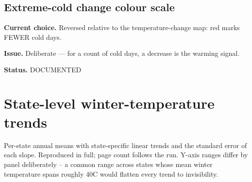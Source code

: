 \documentclass[11pt, english, letterpaper]{article}
\newcommand*{\figTwo}{exhibits}%
\begin{document}
\subsection*{Extreme-cold change colour scale}
\textbf{Current choice.} Reversed relative to the temperature-change map: red marks FEWER cold days.\par
\textbf{Issue.} Deliberate — for a count of cold days, a decrease is the warming signal.\par
\textbf{Status.} DOCUMENTED
\clearpage
\appendix
\section{State-level winter-temperature trends}
\label{app:states}
Per-state annual means with state-specific linear trends and the standard error
of each slope. Reproduced in full; page count follows the run. Y-axis ranges
differ by panel deliberately -- a common range across states whose mean winter
temperature spans roughly 40\textdegree C would flatten every trend to invisibility.

\end{document}

